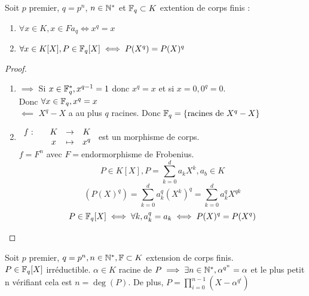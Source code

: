\documentclass[]{report}
\begin{document}
    \begin{lm}{}{}
        Soit $p$ premier, $q=p^n$, $n\in\mathbb{N}^*$ et $\mathbb{F}_q\subset K$ extention de corps finis :\\
        \begin{enumerate}
            \item $\forall x\in K, x\in Fa_q\iff x^q=x$
            \item $\forall x\in K[X],P\in\mathbb{F}_q[X]\iff P(X^q)=P(X)^q$
        \end{enumerate}
    \end{lm}

    \begin{proof}
        \begin{enumerate}
            \item $\implies$ Si $x\in\mathbb{F}_q^*,x^{q-1}=1$ donc $x^q=x$ et si $x=0,0^q=0$.\\
            Donc $\forall x\in\mathbb{F}_q,x^q=x$\\
            $\impliedby$ $X^q-X$ a au plus $q$ racines. Donc $\mathbb{F}_q=\{\text{racines de }X^q-X\}$
            \item $\begin{array}{ccccc} f : & & K & \to & K \\ & & x & \mapsto & x^q \end{array}$ est un morphisme de corps.\\
            $f=F^n$ avec $F=$endormorphisme de Frobenius.
            \[P\in K[X],P=\sum_{k=0}^d a_k X^k,a_b\in K\]
            \[(P(X)^q)=\sum_{k=0}^d a_k^q (X^k)^q=\sum_{k=0}^d a_k^q X^{qk}\]
            \[P\in \mathbb{F}_q[X] \iff \forall k, a_k^q=a_k\iff P(X)^q=P(X^q)\]
        \end{enumerate}
    \end{proof}

    \begin{lm}{}{}
        Soit $p$ premier, $q=p^n,n\in\mathbb{N}^*,\mathbb{F}\subset K$ extension de corps finis.\\
        $P\in \mathbb{F}_q[X]$ irréductible. $\alpha\in K$ racine de $P\implies\exists n\in\mathbb{N}^*,\alpha^{q^n}=\alpha$ et le plus petit n vérifiant cela est $n=\deg(P)$. De plus, $\displaystyle{P=\prod_{i=0}^{n-1}(X-\alpha^{q^i})}$
    \end{lm}
\end{document}

